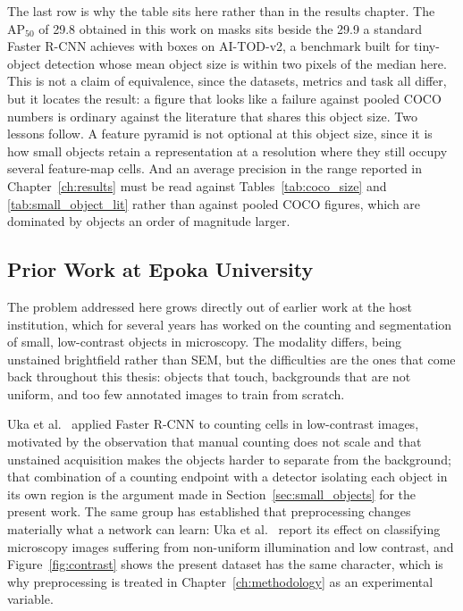 The last row is why the table sits here rather than in the results chapter. The
$\mathrm{AP}_{50}$ of 29.8 obtained in this work on masks sits beside the 29.9 a
standard Faster R-CNN achieves with boxes on AI-TOD-v2, a
benchmark built for tiny-object detection whose mean object size is within two
pixels of the median here. This is not a claim of equivalence, since the datasets,
metrics and task all differ, but it locates the result: a figure that looks like a
failure against pooled COCO numbers is ordinary against the literature that shares
this object size. Two lessons follow. A feature pyramid is not optional at this
object size, since it is how small objects retain a representation at a resolution
where they still occupy several feature-map cells. And an average precision in the
range reported in Chapter~\ref{ch:results} must be read against
Tables~\ref{tab:coco_size} and \ref{tab:small_object_lit} rather than against
pooled COCO figures, which are dominated by objects an order of magnitude larger.

\subsection{Prior Work at Epoka University}
\label{sec:epoka_prior}

The problem addressed here grows directly out of earlier work at the host
institution, which for several years has worked on the counting and segmentation
of small, low-contrast objects in microscopy. The modality differs, being
unstained brightfield rather than SEM, but the difficulties are the ones that come back
throughout this thesis: objects that touch, backgrounds that are not uniform, and
too few annotated images to train from scratch.

Uka et al.\ \cite{uka2020faster} applied Faster R-CNN to counting cells in
low-contrast images, motivated by the observation that manual counting does
not scale and that unstained acquisition makes the objects harder to separate from
the background; that combination of a counting endpoint with a detector isolating
each object in its own region is the argument made in
Section~\ref{sec:small_objects} for the present work. The same group has
established that preprocessing changes materially what a network can learn: Uka et
al.\ \cite{uka2020preprocessing} report its effect on classifying microscopy
images suffering from non-uniform illumination and low contrast, and
Figure~\ref{fig:contrast} shows the present dataset has the same character, which
is why preprocessing is treated in Chapter~\ref{ch:methodology} as an experimental
variable.

